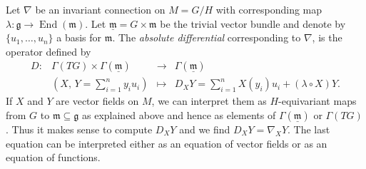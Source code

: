 \documentclass{amsart}
\theoremstyle{plain}
\theoremstyle{remark}
\newcommand\g{{\mathfrak{g}}}
\newcommand\m{{\mathfrak{m}}}
\newcommand\End{\operatorname{End}}
\begin{document}
{Let $\nabla$ be an invariant connection on $M=G/H$ with corresponding map $\lambda:\g\to \End(\m)$. Let $\underline{\m}=G\times \m$ be the trivial vector bundle and denote by $\{u_1,\ldots,u_n\}$ a basis for $\m$. The \emph{absolute differential} corresponding to $\nabla$, is the operator defined by  
\[
\begin{array}{rrcl}
D: & \Gamma(TG)\times \Gamma(\underline{\m}) &\to & \Gamma(\underline{\m}) \\[6pt] 
& \left( X, \, Y=\sum_{i=1}^n y_i u_i \right) & \mapsto &
D_X Y = \sum_{i=1}^n X(y_i) u_i + (\lambda\circ X)Y.
\end{array}
\]
If $X$ and $Y$ are vector fields on $M$, we can interpret them as $H$-equivariant maps from $G$ to $\m \subseteq \g$ as explained above and hence as elements of $\Gamma(\underline{\m})$ or $\Gamma(TG)$. Thus it makes sense to compute $D_XY$ and we find $D_X Y = \nabla_X Y$. The last equation can  be interpreted either as an equation of vector fields or as an equation of functions. 

}
\end{document}
